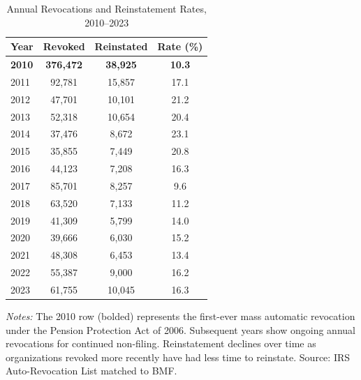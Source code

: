 \begin{table}[htbp]
\centering
\caption{Annual Revocations and Reinstatement Rates, 2010--2023}
\label{tab:waves}
\begin{tabular}{lccc}
\toprule
Year & Revoked & Reinstated & Rate (\%) \\
\midrule
\textbf{2010} & \textbf{376,472} & \textbf{38,925} & \textbf{10.3} \\
2011 & 92,781 & 15,857 & 17.1 \\
2012 & 47,701 & 10,101 & 21.2 \\
2013 & 52,318 & 10,654 & 20.4 \\
2014 & 37,476 & 8,672 & 23.1 \\
2015 & 35,855 & 7,449 & 20.8 \\
2016 & 44,123 & 7,208 & 16.3 \\
2017 & 85,701 & 8,257 & 9.6 \\
2018 & 63,520 & 7,133 & 11.2 \\
2019 & 41,309 & 5,799 & 14.0 \\
2020 & 39,666 & 6,030 & 15.2 \\
2021 & 48,308 & 6,453 & 13.4 \\
2022 & 55,387 & 9,000 & 16.2 \\
2023 & 61,755 & 10,045 & 16.3 \\
\bottomrule
\end{tabular}
\begin{tablenotes}
\item \textit{Notes:} The 2010 row (bolded) represents the first-ever mass automatic revocation under the Pension Protection Act of 2006. Subsequent years show ongoing annual revocations for continued non-filing. Reinstatement declines over time as organizations revoked more recently have had less time to reinstate. Source: IRS Auto-Revocation List matched to BMF.
\end{tablenotes}
\end{table}
